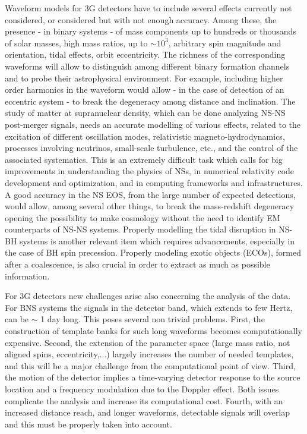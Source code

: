 Waveform models for 3G detectors have to include several effects currently not considered, or considered but with not enough accuracy. Among these, the presence - in binary systems - of mass components up to hundreds or thousands of solar masses, high mass ratios, up to $\sim 10^3$, arbitrary spin magnitude and orientation, tidal effects, orbit eccentricity. The richness of the corresponding waveforms will allow to distinguish among different binary formation channels and to probe their astrophysical environment. For example, including higher order harmonics in the waveform would allow - in the case of detection of an eccentric system - to break the degeneracy among distance and inclination. The study of matter at supranuclear density, which can be done analyzing NS-NS post-merger signals, needs an accurate modelling of various effects, related to the excitation of different oscillation modes, relativistic magneto-hydrodynamics, processes involving neutrinos, small-scale turbulence, etc., and the control of the associated systematics. This is an extremely difficult task which calls for big improvements in understanding the physics of NSs, in numerical relativity code development and optimization, and in computing frameworks and infrastructures. A good accuracy in the NS EOS, from the large number of expected detections, would allow, among several other things, to break the mass-redshift degeneracy opening the possibility to make cosmology without the need to identify EM counterparts of NS-NS systems. Properly modelling the tidal disruption in NS-BH systems is another relevant item which requires advancements, especially in the case of BH spin precession. Properly modeling exotic objects (ECOs), formed after a coalescence, is also crucial in order to extract as much as possible information.

For 3G detectors new challenges arise also concerning the analysis of the data. For BNS systems the signals in the detector band, which extends to few Hertz, can be $\sim$ 1 day long. This poses several non trivial problems. First, the construction of template banks for such long waveforms becomes computationally expensive. Second, the extension of the parameter space (large mass ratio, not aligned spins, eccentricity,...) largely increases the number of needed templates, and this will be a major challenge from the computational point of view. Third, the motion of the detector implies a time-varying detector response to the source location and a frequency modulation due to the Doppler effect. Both issues complicate the analysis and increase its computational cost. Fourth, with an increased distance reach, and longer waveforms, detectable signals will overlap and this must be properly taken into account.

